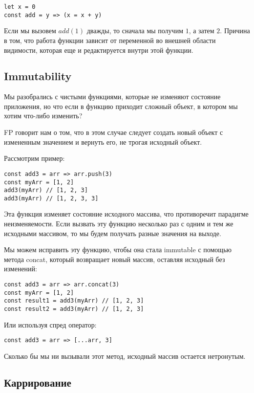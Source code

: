 \begin{lstlisting}
let x = 0
const add = y => (x = x + y)
\end{lstlisting}

Если мы вызовем $add(1)$ дважды, то сначала мы получим $1$, а затем $2$. Причина в том, что работа функции зависит от переменной во внешней области видимости, которая еще и редактируется внутри этой функции.

\subsection*{Immutability}

Мы разобрались с чистыми функциями, которые не изменяют состояние приложения, но что если в функцию приходит сложный объект, в котором мы хотим что-либо изменить? 

FP говорит нам о том, что в этом случае следует создать новый объект с измененным значением и вернуть его, не трогая исходный объект.

Рассмотрим пример:

\begin{lstlisting}
const add3 = arr => arr.push(3)
const myArr = [1, 2]
add3(myArr) // [1, 2, 3]
add3(myArr) // [1, 2, 3, 3]
\end{lstlisting}

Эта функция изменяет состояние исходного массива, что противоречит парадигме неизменяемости. Если вызвать эту функцию несколько раз с одним и тем же исходными массивом, то мы будем получать разные значения на выходе.

Мы можем исправить эту функцию, чтобы она стала immutable с помощью метода concat, который возвращает новый массив, оставляя исходный без изменений:

\begin{lstlisting}
const add3 = arr => arr.concat(3)
const myArr = [1, 2]
const result1 = add3(myArr) // [1, 2, 3]
const result2 = add3(myArr) // [1, 2, 3]
\end{lstlisting}

Или используя спред оператор:

\begin{lstlisting}
const add3 = arr => [...arr, 3]
\end{lstlisting}

Сколько бы мы ни вызывали этот метод, исходный массив остается нетронутым. 

\subsection*{Каррирование}

